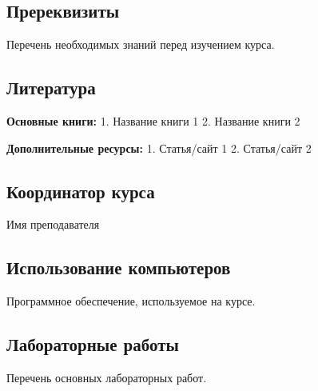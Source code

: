 \documentclass[a4paper,12pt]{article}
\begin{document}
\subsection*{Пререквизиты}
Перечень необходимых знаний перед изучением курса.

\subsection*{Литература}
\textbf{Основные книги:}  
1. Название книги 1  
2. Название книги 2  

\textbf{Дополнительные ресурсы:}  
1. Статья/сайт 1  
2. Статья/сайт 2  

\subsection*{Координатор курса}
Имя преподавателя

\subsection*{Использование компьютеров}
Программное обеспечение, используемое на курсе.

\subsection*{Лабораторные работы}
Перечень основных лабораторных работ.
\end{document}
